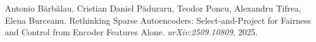 Antonio B\u{a}rb\u{a}lau, Cristian Daniel P\u{a}duraru, Teodor Poncu, Alexandru Tifrea, Elena Burceanu.
\newblock Rethinking Sparse Autoencoders: Select-and-Project for Fairness and Control from Encoder Features Alone.
\newblock \emph{arXiv:2509.10809}, 2025.
